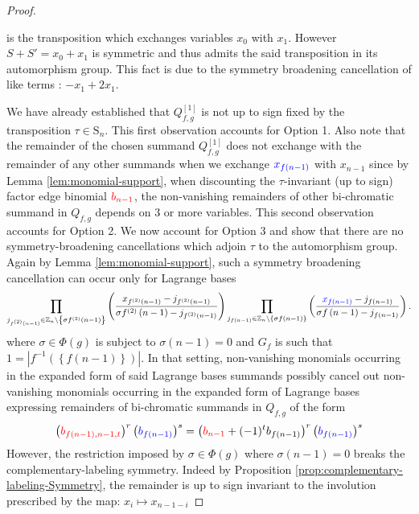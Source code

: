 \begin{proof}
\begin{enumerate}
is the transposition which exchanges variables $x_{0}$ with $x_{1}$.
However $S+S'=x_{0}+x_{1}$ is symmetric and thus admits the said transposition
in its automorphism group. This fact is due to the symmetry broadening
cancellation of like terms : $-x_{1}+2x_{1}$.
\end{enumerate}
We have already established that $Q_{f,g}^{\left[1\right]}$ is not up to sign fixed by the transposition $\tau\in\text{S}_{n}$. This first observation accounts for Option 1. Also note that the remainder
of the chosen summand $Q_{f,g}^{\left[1\right]}$ does not exchange with the remainder of any
other summands when we exchange ${\color{blue}x_{f\left(n-1\right)}}$
with $x_{n-1}$ since by Lemma \ref{lem:monomial-support}, when discounting the $\tau$-invariant (up to sign) factor edge binomial ${\color{red}b_{n-1}}$, the non-vanishing remainders of other
bi-chromatic summand in $Q_{f,g}$  depends on $3$ or more variables.
This second observation accounts for Option 2. We now account for
Option 3 and show that there are no symmetry-broadening
cancellations which adjoin $\tau$ to the automorphism group. Again by Lemma \ref{lem:monomial-support}, such a symmetry broadening cancellation
can occur only for Lagrange bases
\[
\prod_{j_{f^{(2)}\left(n-1\right)}\in\mathbb{Z}_{n}\backslash\left\{ \sigma f^{(2)}\left(n-1\right)\right\} }\left(\frac{x_{f^{(2)}\left(n-1\right)}-j_{f^{(2)}\left(n-1\right)}}{\sigma f^{(2)}\left(n-1\right)-j_{f^{(2)}\left(n-1\right)}}\right)\prod_{j_{f\left(n-1\right)}\in\mathbb{Z}_{n}\backslash\left\{ \sigma f\left(n-1\right)\right\} }\left(\frac{{\color{blue}x_{f\left(n-1\right)}}-j_{f\left(n-1\right)}}{\sigma f\left(n-1\right)-j_{f\left(n-1\right)}}\right).
\]
where $\sigma\in\Phi(g)$
is subject to $\sigma\left(n-1\right)=0$ and $G_{f}$ is such that
$1=\left|f^{-1}\left(\left\{ f\left(n-1\right)\right\} \right)\right|$.
In that setting, non-vanishing monomials occurring in the expanded
form of said Lagrange bases summands possibly cancel out non-vanishing
monomials occurring in the expanded form of Lagrange bases expressing
remainders of bi-chromatic summands in $Q_{f,g}$ of the form
\[
\left({\color{red}b_{f(n-1),n-1,t}}\right)^{r}\left({\color{blue}b_{f\left(n-1\right)}}\right)^{s}=\left({\color{red}b_{n-1}}+(-1)^{t}b_{f\left(n-1\right)}\right)^{r}\left({\color{blue}b_{f\left(n-1\right)}}\right)^{s}
\]
However, the restriction imposed by
$\sigma\in\Phi(g)$ where $\sigma\left(n-1\right)=0$ breaks the complementary-labeling
symmetry. Indeed by Proposition \ref{prop:complementary-labeling-Symmetry}, the remainder
is up to sign invariant to the involution prescribed by the map: $x_{i}\mapsto x_{n-1-i}$

\end{proof}
